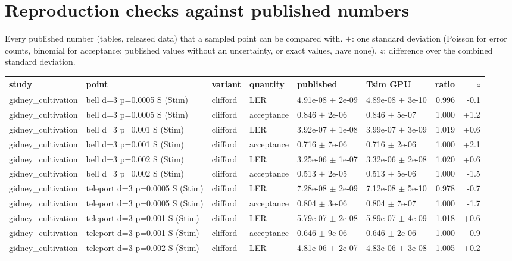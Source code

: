 \documentclass[10pt]{article}
\begin{document}
\section*{Reproduction checks against published numbers}
Every published number (tables, released data) that a sampled point can be compared with. $\pm$: one standard deviation (Poisson for error counts, binomial for acceptance; published values without an uncertainty, or exact values, have none). $z$: difference over the combined standard deviation.

{\scriptsize
\begin{longtable}{l l l l l l r r}
\toprule
study & point & variant & quantity & published & Tsim GPU & ratio & $z$ \\
\midrule
\endhead
gidney\_cultivation & bell d=3 p=0.0005 S (Stim) & clifford & LER & 4.91e-08 $\pm$ 2e-09 & 4.89e-08 $\pm$ 3e-10 & 0.996 & -0.1 \\
gidney\_cultivation & bell d=3 p=0.0005 S (Stim) & clifford & acceptance & 0.846 $\pm$ 2e-06 & 0.846 $\pm$ 5e-07 & 1.000 & +1.2 \\
gidney\_cultivation & bell d=3 p=0.001 S (Stim) & clifford & LER & 3.92e-07 $\pm$ 1e-08 & 3.99e-07 $\pm$ 3e-09 & 1.019 & +0.6 \\
gidney\_cultivation & bell d=3 p=0.001 S (Stim) & clifford & acceptance & 0.716 $\pm$ 7e-06 & 0.716 $\pm$ 2e-06 & 1.000 & +2.1 \\
gidney\_cultivation & bell d=3 p=0.002 S (Stim) & clifford & LER & 3.25e-06 $\pm$ 1e-07 & 3.32e-06 $\pm$ 2e-08 & 1.020 & +0.6 \\
gidney\_cultivation & bell d=3 p=0.002 S (Stim) & clifford & acceptance & 0.513 $\pm$ 2e-05 & 0.513 $\pm$ 5e-06 & 1.000 & -1.5 \\
gidney\_cultivation & teleport d=3 p=0.0005 S (Stim) & clifford & LER & 7.28e-08 $\pm$ 2e-09 & 7.12e-08 $\pm$ 5e-10 & 0.978 & -0.7 \\
gidney\_cultivation & teleport d=3 p=0.0005 S (Stim) & clifford & acceptance & 0.804 $\pm$ 3e-06 & 0.804 $\pm$ 7e-07 & 1.000 & -1.7 \\
gidney\_cultivation & teleport d=3 p=0.001 S (Stim) & clifford & LER & 5.79e-07 $\pm$ 2e-08 & 5.89e-07 $\pm$ 4e-09 & 1.018 & +0.6 \\
gidney\_cultivation & teleport d=3 p=0.001 S (Stim) & clifford & acceptance & 0.646 $\pm$ 9e-06 & 0.646 $\pm$ 2e-06 & 1.000 & -0.9 \\
gidney\_cultivation & teleport d=3 p=0.002 S (Stim) & clifford & LER & 4.81e-06 $\pm$ 2e-07 & 4.83e-06 $\pm$ 3e-08 & 1.005 & +0.2 \\

\end{longtable}}
\end{document}
